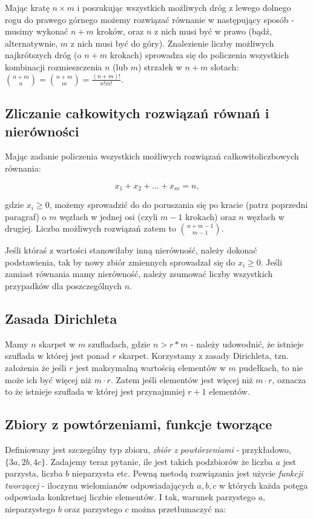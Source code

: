 \documentclass[11pt]{article}
\theoremstyle{definition}
\numberwithin{zadanie}{subsection}
\begin{document}
Mając kratę $n\times m$ i poszukując wszystkich możliwych dróg z lewego dolnego rogu do prawego górnego możemy rozwiązać równanie w następujący sposób - musimy wykonać $n+m$ kroków, oraz $n$ z nich musi być w prawo (bądź, alternatywnie, $m$ z nich musi być do góry). Znalezienie liczby możliwych najkrótszych dróg (o $n+m$ krokach) sprowadza się do policzenia wszystkich kombinacji rozmieszczenia $n$ (lub $m$) strzałek w $n+m$ slotach: $\binom{n+m}{n}=\binom{n+m}{m}=\frac{(n+m)!}{n!m!}$.

\subsection{Zliczanie całkowitych rozwiązań równań i nierówności}

Mając zadanie policzenia wszystkich możliwych rozwiązań całkowitoliczbowych równania:

$$x_1+x_2+...+x_m = n,$$

gdzie $x_i\geq 0$, możemy sprowadzić do do poruszania się po kracie (patrz poprzedni paragraf) o $m$ węzłach w jednej osi (czyli $m-1$ krokach) oraz $n$ węzłach w drugiej. Liczba możliwych rozwiązań zatem to $\binom{n+m-1}{m-1}$.

Jeśli któraś z wartości stanowiłaby inną nierówność, należy dokonać podstawienia, tak by nowy zbiór zmiennych sprowadzał się do $x_i\geq 0$. Jeśli zamiast równania mamy nierówność, należy zsumować liczby wszystkich przypadków dla poszczególnych $n$.

\subsection{Zasada Dirichleta}

Mamy $n$ skarpet w $m$ szufladach, gdzie $n > r*m$ - należy udowodnić, że istnieje szuflada w której jest ponad $r$ skarpet. Korzystamy z zasady Dirichleta, tzn. założenia że jeśli $r$ jest maksymalną wartością elementów w $m$ pudełkach, to nie może ich być więcej niż $m\cdot r$. Zatem jeśli elementów jest więcej niż $m\cdot r$, oznacza to że istnieje szuflada w której jest przynajmniej $r+1$ elementów.

\subsection{Zbiory z powtórzeniami, funkcje tworzące}

Definiowany jest szczególny typ zbioru, \textit{zbiór z powtórzeniami} - przykładowo, $\{3a,2b,4c\}$. Zadajemy teraz pytanie, ile jest takich podzbiorów że liczba $a$ jest parzysta, liczba $b$ nieparzysta etc. Pewną metodą rozwiązania jest użycie \textit{funkcji tworzącej} - iloczynu wielomianów odpowiadających $a, b, c$ w których każda potęga odpowiada konkretnej liczbie elementów. I tak, warunek parzystego $a$, nieparzystego $b$ oraz parzystego $c$ można przetłumaczyć na:
\end{document}
